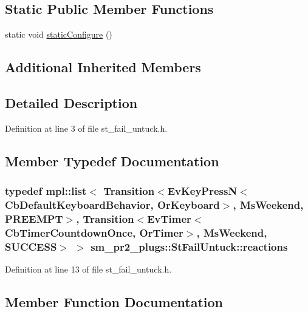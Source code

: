 \subsection*{Static Public Member Functions}
\begin{DoxyCompactItemize}
\item 
static void \hyperlink{structsm__pr2__plugs_1_1StFailUntuck_abd604f84f00dc9f4e8f9ffaae1f1340b}{static\+Configure} ()
\end{DoxyCompactItemize}
\subsection*{Additional Inherited Members}


\subsection{Detailed Description}


Definition at line 3 of file st\+\_\+fail\+\_\+untuck.\+h.



\subsection{Member Typedef Documentation}
\subsubsection[{\texorpdfstring{reactions}{reactions}}]{\setlength{\rightskip}{0pt plus 5cm}typedef mpl\+::list$<$ Transition$<$Ev\+Key\+PressN$<$Cb\+Default\+Keyboard\+Behavior, {\bf Or\+Keyboard}$>$, {\bf Ms\+Weekend}, {\bf P\+R\+E\+E\+M\+PT}$>$, Transition$<$Ev\+Timer$<$Cb\+Timer\+Countdown\+Once, {\bf Or\+Timer}$>$, {\bf Ms\+Weekend}, {\bf S\+U\+C\+C\+E\+SS}$>$ $>$ {\bf sm\+\_\+pr2\+\_\+plugs\+::\+St\+Fail\+Untuck\+::reactions}}\hypertarget{structsm__pr2__plugs_1_1StFailUntuck_a2761af1a5a323afe29a5a9a79e52f951}{}\label{structsm__pr2__plugs_1_1StFailUntuck_a2761af1a5a323afe29a5a9a79e52f951}


Definition at line 13 of file st\+\_\+fail\+\_\+untuck.\+h.



\subsection{Member Function Documentation}
